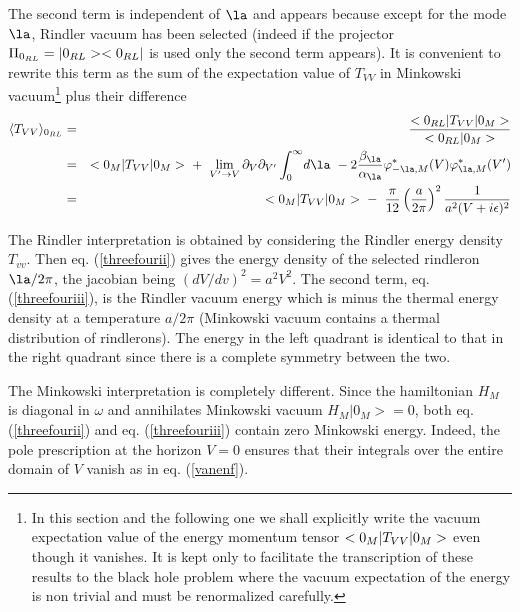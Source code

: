The second term is independent of $\la$ and appears because except
for the mode
$\la$, Rindler vacuum has been selected (indeed if
the projector $\Pi_{0_{RL}} =
\mbox{$ \vert 0_{RL} > $}\mbox{$ < 0_{RL} \vert $}$ is used only the second term
appears). It is convenient to rewrite this term as the sum of the
expectation value of $T_{VV}$ in Minkowski vacuum\footnote{
In this section and the following one we shall explicitly write the vacuum
expectation value of the energy momentum tensor $\mbox{$ \mbox{$ < 0_M \vert $} T_{VV} \mbox{$ \vert 0_M > $} $}$
even though it vanishes. It is kept only to facilitate the transcription of
these results  to the black hole problem
where the vacuum expectation of the energy is non trivial and must be
renormalized
carefully.} plus their difference
\begin{eqnarray}
\langle T_{VV} \rangle_{0_{RL}} &=&
{\expect{0_{RL}}{T_{VV}}{0_M} \over \scal {0_{RL}}{0_M} }\nonumber\\  &=&
\expect{0_M}{T_{VV}}{0_M} \ + \
\lim_{V^\prime \rightarrow V} \partial_V\partial_{V^\prime} \int_0^\infty \!
d\la\  -2 {\beta_{\la} \over \alpha_{\la} }\varphi_{-\la,M}^*(V)
\varphi_{\la,M}^*(V^\prime) \nonumber\\
&=&\expect{0_M}{T_{VV}}{0_M} \ - \ {\pi
\over 12} \left( a \over 2 \pi \right)^2 {1 \over a^2(V + i \e)^2}
\label{threefouriii} \end{eqnarray}

The Rindler
interpretation
is obtained by
considering the Rindler energy density $T_{vv}$.
Then eq. (\ref{threefourii}) gives  the energy density of the selected
 rindleron $\la/2 \pi$, the jacobian being
$\left( d V / dv \right)^2 = a^2 V^2$.
The second term, eq. (\ref{threefouriii}), is
the  Rindler vacuum energy\cite{tmunu} which is minus the thermal energy
density at a temperature $a/2 \pi$ (Minkowski vacuum
contains a thermal distribution of rindlerons).
The energy in the left quadrant is identical to
that in the right quadrant since there is a complete symmetry between the two.

The Minkowski interpretation is completely different.
Since the hamiltonian
 $H_M$ is diagonal in
$\omega $
and annihilates
Minkowski vacuum
 $H_M |0_M>=0$, both eq. (\ref{threefourii}) and  eq. (\ref{threefouriii})
contain zero Minkowski energy. Indeed, the pole prescription at the
horizon $V=0$ ensures that their integrals over the entire
domain of $V$ vanish as in eq. (\ref{vanenf}).


